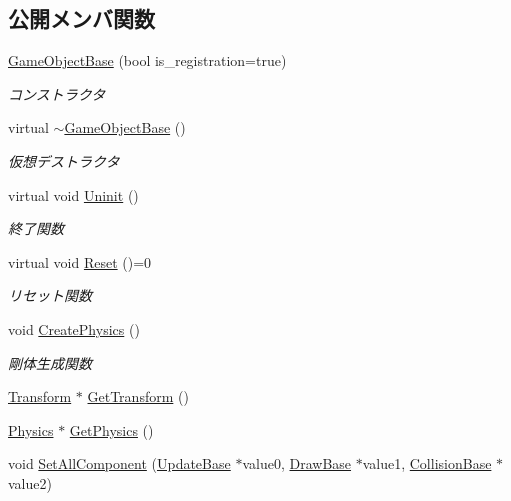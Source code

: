 \subsection*{公開メンバ関数}
\begin{DoxyCompactItemize}
\item 
\mbox{\hyperlink{class_game_object_base_a4682a3e88a45a462de288f14e9a8545d}{Game\+Object\+Base}} (bool is\+\_\+registration=true)
\begin{DoxyCompactList}\small\item\em コンストラクタ \end{DoxyCompactList}\item 
virtual \mbox{\hyperlink{class_game_object_base_a0cb813d5c7af673a3d190eb1b2d26275}{$\sim$\+Game\+Object\+Base}} ()
\begin{DoxyCompactList}\small\item\em 仮想デストラクタ \end{DoxyCompactList}\item 
virtual void \mbox{\hyperlink{class_game_object_base_a97e1bc277d7b1c0156d4735de29a022c}{Uninit}} ()
\begin{DoxyCompactList}\small\item\em 終了関数 \end{DoxyCompactList}\item 
virtual void \mbox{\hyperlink{class_game_object_base_a85c59554f734bcb09f1a1e18d9517dce}{Reset}} ()=0
\begin{DoxyCompactList}\small\item\em リセット関数 \end{DoxyCompactList}\item 
void \mbox{\hyperlink{class_game_object_base_adf7df49baa04363c63f9515317776e40}{Create\+Physics}} ()
\begin{DoxyCompactList}\small\item\em 剛体生成関数 \end{DoxyCompactList}\item 
\mbox{\hyperlink{class_transform}{Transform}} $\ast$ \mbox{\hyperlink{class_game_object_base_a7df1e16838f8fa578a27e8ba64652b49}{Get\+Transform}} ()
\item 
\mbox{\hyperlink{class_physics}{Physics}} $\ast$ \mbox{\hyperlink{class_game_object_base_a853cdb5dbb2edf28e45e49540f85e554}{Get\+Physics}} ()
\item 
void \mbox{\hyperlink{class_game_object_base_aad0e581dfba83d11af6412a0df6ecd90}{Set\+All\+Component}} (\mbox{\hyperlink{class_update_base}{Update\+Base}} $\ast$value0, \mbox{\hyperlink{class_draw_base}{Draw\+Base}} $\ast$value1, \mbox{\hyperlink{class_collision_base}{Collision\+Base}} $\ast$value2)

\end{DoxyCompactItemize}

